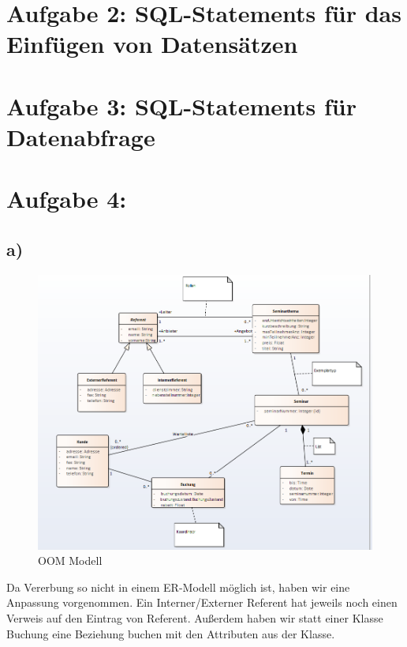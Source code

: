 \documentclass[10pt,a4paper]{report}
\begin{document}


\section{Aufgabe 2: SQL-Statements für das Einfügen von Datensätzen}


\section{Aufgabe 3: SQL-Statements für Datenabfrage}


\section{Aufgabe 4: }
\subsection{a)}


\begin{figure}[ht!]
	\includegraphics[scale=0.6]{Bilder/diagram02.PNG}
	\caption{OOM Modell}
	\label{er:1}
\end{figure}




Da Vererbung so nicht in einem ER-Modell möglich ist, haben wir eine Anpassung vorgenommen. Ein Interner/Externer Referent hat jeweils noch einen Verweis auf den Eintrag von Referent.
Außerdem haben wir statt einer Klasse Buchung eine Beziehung buchen mit den Attributen aus der Klasse.
\end{document}
